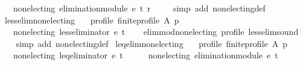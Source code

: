 \begin{isabellebody}
\ \ \ {\isachardoublequoteopen}non{\isacharunderscore}{\kern0pt}electing\ {\isacharparenleft}{\kern0pt}elimination{\isacharunderscore}{\kern0pt}module\ e\ t\ r\ {\isacharparenright}{\kern0pt}{\isachardoublequoteclose}\isanewline
%
\isadelimproof
\ \ %
\endisadelimproof
%
\isatagproof
{}\isamarkupfalse%
\ {\isacharparenleft}{\kern0pt}simp\ add{\isacharcolon}{\kern0pt}\ non{\isacharunderscore}{\kern0pt}electing{\isacharunderscore}{\kern0pt}def{\isacharparenright}{\kern0pt}%
\endisatagproof
{\isafoldproof}%
%
\isadelimproof
\isanewline
%
\endisadelimproof
\isanewline
{}\isamarkupfalse%
\ less{\isacharunderscore}{\kern0pt}elim{\isacharunderscore}{\kern0pt}non{\isacharunderscore}{\kern0pt}electing{\isacharcolon}{\kern0pt}\isanewline
\ \ \ profile{\isacharcolon}{\kern0pt}\ {\isachardoublequoteopen}finite{\isacharunderscore}{\kern0pt}profile\ A\ p{\isachardoublequoteclose}\isanewline
\ \ \ {\isachardoublequoteopen}non{\isacharunderscore}{\kern0pt}electing\ {\isacharparenleft}{\kern0pt}less{\isacharunderscore}{\kern0pt}eliminator\ e\ t{\isacharparenright}{\kern0pt}{\isachardoublequoteclose}\isanewline
%
\isadelimproof
\ \ %
\endisadelimproof
%
\isatagproof
{}\isamarkupfalse%
\ elim{\isacharunderscore}{\kern0pt}mod{\isacharunderscore}{\kern0pt}non{\isacharunderscore}{\kern0pt}electing\ profile\ less{\isacharunderscore}{\kern0pt}elim{\isacharunderscore}{\kern0pt}sound\isanewline
\ \ \isamarkupfalse%
\ {\isacharparenleft}{\kern0pt}simp\ add{\isacharcolon}{\kern0pt}\ non{\isacharunderscore}{\kern0pt}electing{\isacharunderscore}{\kern0pt}def{\isacharparenright}{\kern0pt}%
\endisatagproof
{\isafoldproof}%
%
\isadelimproof
\isanewline
%
\endisadelimproof
\isanewline
{}\isamarkupfalse%
\ leq{\isacharunderscore}{\kern0pt}elim{\isacharunderscore}{\kern0pt}non{\isacharunderscore}{\kern0pt}electing{\isacharcolon}{\kern0pt}\isanewline
\ \ \ profile{\isacharcolon}{\kern0pt}\ {\isachardoublequoteopen}finite{\isacharunderscore}{\kern0pt}profile\ A\ p{\isachardoublequoteclose}\isanewline
\ \ \ {\isachardoublequoteopen}non{\isacharunderscore}{\kern0pt}electing\ {\isacharparenleft}{\kern0pt}leq{\isacharunderscore}{\kern0pt}eliminator\ e\ t{\isacharparenright}{\kern0pt}{\isachardoublequoteclose}\isanewline
%
\isadelimproof
%
\endisadelimproof
%
\isatagproof
{}\isamarkupfalse%
\ {\isacharminus}{\kern0pt}\isanewline
\ \ \isamarkupfalse%
\ {\isachardoublequoteopen}non{\isacharunderscore}{\kern0pt}electing\ {\isacharparenleft}{\kern0pt}elimination{\isacharunderscore}{\kern0pt}module\ e\ t\ {\isacharparenleft}{\kern0pt}{\isasymle}{\isacharparenright}{\kern0pt}{\isacharparenright}{\kern0pt}{\isachardoublequoteclose}\isanewline

\end{isabellebody}

